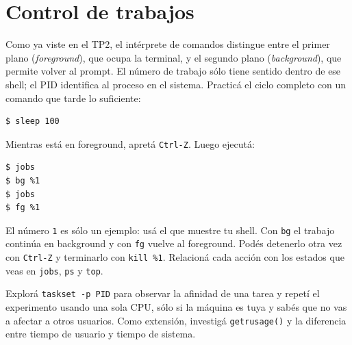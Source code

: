 \documentclass[11pt,a4paper]{article}
\begin{document}
\section{Control de trabajos}

Como ya viste en el TP2, el intérprete de comandos distingue entre el primer
plano (\emph{foreground}), que ocupa la terminal, y el segundo plano
(\emph{background}), que permite volver al prompt. El número de trabajo sólo
tiene sentido dentro de ese shell; el PID identifica al proceso en el sistema.
Practicá el ciclo completo con un comando que tarde lo suficiente:

\begin{lstlisting}[language=bash]
$ sleep 100
\end{lstlisting}

Mientras está en foreground, apretá \texttt{Ctrl-Z}. Luego ejecutá:

\begin{lstlisting}[language=bash]
$ jobs
$ bg %1
$ jobs
$ fg %1
\end{lstlisting}

El número \texttt{1} es sólo un ejemplo: usá el que muestre tu shell. Con
\texttt{bg} el trabajo continúa en background y con \texttt{fg} vuelve al
foreground. Podés detenerlo otra vez con \texttt{Ctrl-Z} y terminarlo con
\texttt{kill \%1}. Relacioná cada acción con los estados que veas en
\texttt{jobs}, \texttt{ps} y \texttt{top}.

\begin{extrabox}
Explorá \texttt{taskset -p PID} para observar la afinidad de una tarea y
repetí el experimento usando una sola CPU, sólo si la máquina es tuya y sabés
que no vas a afectar a otros usuarios. Como extensión, investigá
\texttt{getrusage()} y la diferencia entre tiempo de usuario y tiempo de
sistema.
\end{extrabox}
\end{document}
